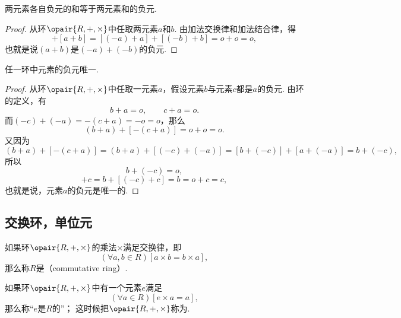 \begin{property}
两元素各自负元的和等于两元素和的负元.
\begin{proof}
从环\(\opair{R,+,\times}\)中任取两元素\(a\)和\(b\).
由加法交换律和加法结合律，得\begin{equation*}
	[(-a) + (-b)] + [a + b]
	= [(-a) + a] + [(-b) + b]
	= o + o = o,
\end{equation*}
也就是说\((a+b)\)是\((-a) + (-b)\)的负元.
\end{proof}
\end{property}

\begin{property}
任一环中元素的负元唯一.
\begin{proof}
从环\(\opair{R,+,\times}\)中任取一元素\(a\)，假设元素\(b\)与元素\(c\)都是\(a\)的负元.
由环的定义，有\begin{equation*}
	b + a = o, \qquad
	c + a = o.
\end{equation*}
而\((-c) + (-a) = -(c + a) = -o = o\)，那么\begin{equation*}
	(b + a) + [-(c + a)]
	= o + o = o.
\end{equation*}又因为\begin{equation*}
	(b + a) + [-(c + a)]
	= (b + a) + [(-c) + (-a)]
	= [b + (-c)] + [a + (-a)]
	= b + (-c),
\end{equation*}所以\begin{equation*}
	b + (-c) = o,
\end{equation*}\begin{equation*}
	[b + (-c)] + c = b + [(-c) + c] = b = o + c = c,
\end{equation*}
也就是说，元素\(a\)的负元是唯一的.
\end{proof}
\end{property}

\subsection{交换环，单位元}
\begin{definition}
如果环\(\opair{R,+,\times}\)的乘法\(\times\)满足交换律，即\begin{equation*}
	(\forall a,b \in R)[a \times b = b \times a],
\end{equation*}
那么称\(R\)是（commutative ring）.
\end{definition}

\begin{definition}
如果环\(\opair{R,+,\times}\)中有一个元素\(e\)满足\begin{equation*}
	(\forall a \in R)[e \times a = a],
\end{equation*}
那么称“\(e\)是\(R\)的”；
这时候把\(\opair{R,+,\times}\)称为.
\end{definition}

